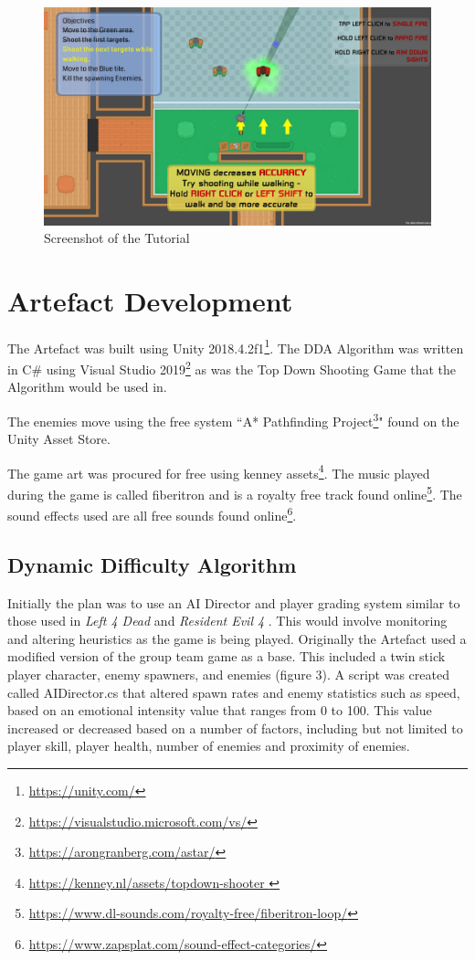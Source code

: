 \documentclass[journal]{IEEEtran}
\begin{document}
\begin{figure}[h]
	\includegraphics[width=1.0\linewidth]{tutorialscreenshot.jpg}
	\caption{Screenshot of the Tutorial}
	\label{Analysis Test}
\end{figure} 



\section{Artefact Development}

The Artefact was built using Unity 2018.4.2f1\footnote{\url{https://unity.com/}}. The DDA Algorithm was written in C\# using Visual Studio 2019\footnote{\url{https://visualstudio.microsoft.com/vs/}} as was the Top Down Shooting Game that the Algorithm would be used in. 

The enemies move using the free system ``A* Pathfinding Project\footnote{\url{https://arongranberg.com/astar/}}" found on the Unity Asset Store.

The game art was procured for free using kenney assets\footnote{\url{https://kenney.nl/assets/topdown-shooter }}. The music played during the game is called fiberitron and is a royalty free track found online\footnote{\url{https://www.dl-sounds.com/royalty-free/fiberitron-loop/}}. The sound effects used are all free sounds found online\footnote{\url{https://www.zapsplat.com/sound-effect-categories/}}.


\subsection{Dynamic Difficulty Algorithm}


Initially the plan was to use an AI Director and player grading system similar to those used in \textit{Left 4 Dead} \cite{game:left4dead} and \textit{Resident Evil 4} \cite{game:re4}. This would involve monitoring and altering heuristics as the game is being played. Originally the Artefact used a modified version of the group team game as a base. This included a twin stick player character, enemy spawners, and enemies (figure 3). A script was created called AIDirector.cs that altered spawn rates and enemy statistics such as speed, based on an emotional intensity value that ranges from 0 to 100. This value increased or decreased based on a number of factors, including but not limited to player skill, player health, number of enemies and proximity of enemies. 
\end{document}
